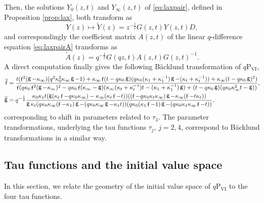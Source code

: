 \documentclass[a4paper,reqno,11pt]{amsart}
\numberwithin{equation}{section}
\numberwithin{figure}{section}
\theoremstyle{plain}
\theoremstyle{remark}
\DeclareMathOperator{\sff}{{\sf f}}
\DeclareMathOperator{\sfg}{{\sf g}}
\newcommand\Psix{\textrm{P}_{\textrm{VI}}}
\numberwithin{rhp}{section}
\begin{document}
Then, the solutions $Y_0(z,t)$ and $Y_\infty(z,t)$ of \eqref{eq:laxpair}, defined in Proposition \ref{prop:lax}, both transform as
\begin{equation*}
    Y(z)\mapsto \widetilde{Y}(z)=z^{-\frac{1}{2}}G(z,t)Y(z,t)D,
\end{equation*}
and correspondingly the coefficient matrix $A(z,t)$ of the linear $q$-difference equation \eqref{eq:laxpairA} transforms as
\begin{equation*}
    \widetilde{A}(z)=q^{-\frac{1}{2}}G(qz,t)A(z,t)G(z,t)^{-1}.
\end{equation*}
A direct computation finally gives the following B\"acklund transformation of $q\Psix$,
\begin{align}\nonumber
\widetilde{{\sf f}}&=\frac{t(\sff^2  (\sfg-\kappa _{\infty }) (q^2 \kappa _0^2  \kappa _{\infty }\sfg-1)+
 \kappa _{\infty }\sff (t-q\kappa _0 \sfg ) ( q\kappa _0 (\kappa _1+\kappa _1^{-1}) \sfg - (\kappa _t+\kappa _t^{-1}))
+ \kappa _{\infty }  (t- q\kappa _0 \sfg)^2)}
{\sff( q\kappa _0  \sff^2 (\sfg-\kappa _{\infty })^2
-q\kappa _0  \sff (\kappa _{\infty }-\sfg) ( \kappa _{\infty } (\kappa _t+\kappa_t^{-1})t-(\kappa _1+\kappa_1^{-1})\sfg  )
+ (t-q \kappa _0 \sfg) (q\kappa _0  \kappa _{\infty}^2t-\sfg))},\\
    \widetilde{\sfg}&=q^{-\frac{1}{2}}\frac{\kappa _0 \kappa _1 t (\sfg ( \kappa _t \sff-q\kappa _0  \kappa _{\infty })-\kappa _{\infty } ( \kappa _t \sff-t)) ( (\sff-q\kappa _0 \kappa _t \kappa _{\infty } )\sfg-\kappa _{\infty } (\sff-t \kappa _t))}{\sfg   \kappa _t (q \kappa _0 \kappa _{\infty }  (\sff-\kappa _1)\sfg-(q \kappa _0  \kappa _{\infty }\sfg-\kappa _1 t)) (q \kappa _0  (\kappa _1\sff-1)\sfg-(q\kappa _0 \kappa _1  \kappa _{\infty }\sff-t))}, \label{eq:BTtau1}
\end{align}
corresponding to shift in parameters related to $\tau_3$.
The parameter transformations, underlying the tau functions $\tau_j$, $j=2,4$, correspond to B\"acklund transformations in a similar way.





\subsection{Tau functions and the initial value space}\label{subsec:tauinitial}
In this section, we relate the geometry of the initial value space of $q\Psix$ to the four tau functions.
\end{document}
